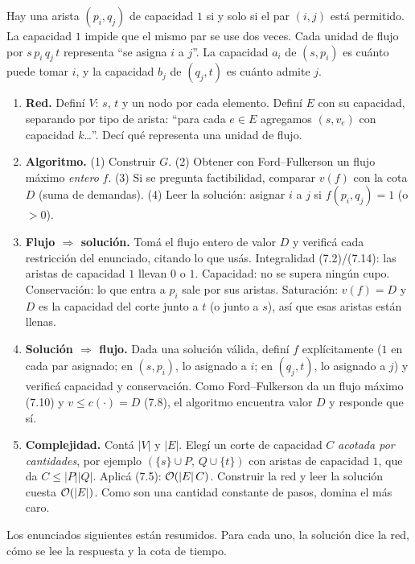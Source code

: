 Hay una arista $(p_i,q_j)$ de capacidad $1$ si y solo si el par $(i,j)$ está permitido. La capacidad $1$ impide que el mismo par se use dos veces. Cada unidad de flujo por $s\,p_i\,q_j\,t$ representa ``se asigna $i$ a $j$''. La capacidad $a_i$ de $(s,p_i)$ es cuánto puede tomar $i$, y la capacidad $b_j$ de $(q_j,t)$ es cuánto admite $j$.

\begin{receta}
\begin{enumerate}
  \item \textbf{Red.} Definí $V$: $s$, $t$ y un nodo por cada elemento. Definí $E$ con su capacidad, separando por tipo de arista: ``para cada $e\in E$ agregamos $(s,v_e)$ con capacidad $k$\ldots''. Decí qué representa una unidad de flujo.
  \item \textbf{Algoritmo.} (1) Construir $G$. (2) Obtener con Ford–Fulkerson un flujo máximo \emph{entero} $f$. (3) Si se pregunta factibilidad, comparar $v(f)$ con la cota $D$ (suma de demandas). (4) Leer la solución: asignar $i$ a $j$ si $f(p_i,q_j)=1$ (o $>0$).
  \item \textbf{Flujo $\Rightarrow$ solución.} Tomá el flujo entero de valor $D$ y verificá cada restricción del enunciado, citando lo que usás. Integralidad (7.2)/(7.14): las aristas de capacidad $1$ llevan $0$ o $1$. Capacidad: no se supera ningún cupo. Conservación: lo que entra a $p_i$ sale por sus aristas. Saturación: $v(f)=D$ y $D$ es la capacidad del corte junto a $t$ (o junto a $s$), así que esas aristas están llenas.
  \item \textbf{Solución $\Rightarrow$ flujo.} Dada una solución válida, definí $f$ explícitamente ($1$ en cada par asignado; en $(s,p_i)$, lo asignado a $i$; en $(q_j,t)$, lo asignado a $j$) y verificá capacidad y conservación. Como Ford–Fulkerson da un flujo máximo (7.10) y $v\le c(\cdot)=D$ (7.8), el algoritmo encuentra valor $D$ y responde que sí.
  \item \textbf{Complejidad.} Contá $|V|$ y $|E|$. Elegí un corte de capacidad $C$ \emph{acotada por cantidades}, por ejemplo $(\{s\}\cup P,\,Q\cup\{t\})$ con aristas de capacidad $1$, que da $C\le|P||Q|$. Aplicá (7.5): $\mathcal{O}(|E|\,C)$. Construir la red y leer la solución cuesta $\mathcal{O}(|E|)$. Como son una cantidad constante de pasos, domina el más caro.
\end{enumerate}
\end{receta}

Los enunciados siguientes están resumidos. Para cada uno, la solución dice la red, cómo se lee la respuesta y la cota de tiempo.

